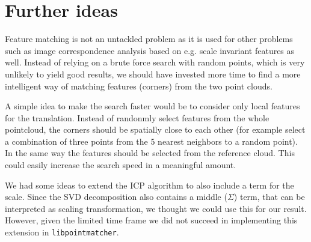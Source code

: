 \documentclass[10pt,twocolumn,letterpaper]{article}
\begin{document}
\section{Further ideas}

Feature matching is not an untackled problem as it is used for other problems such as image correspondence analysis based on e.g. scale invariant features as well. Instead of relying on a brute force search with random points, which is very unlikely to yield good results, we should have invested more time to find a more intelligent way of matching features (corners) from the two point clouds.

A simple idea to make the search faster would be to consider only local features for the translation. Instead of randonmly select features from the whole pointcloud, the corners should be spatially close to each other (for example select a combination of three points from the 5 nearest neighbors to a random point). In the same way the features should be selected from the reference cloud. This could easily increase the search speed in a meaningful amount.

We had some ideas to extend the ICP algorithm to also include a term for the scale. Since the SVD decomposition also contains a middle ($\Sigma$) term, that can be interpreted as scaling transformation, we thought we could use this for our result.
However, given the limited time frame we did not succeed in implementing this extension in \texttt{libpointmatcher}.


{\small


}
\end{document}

